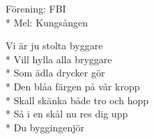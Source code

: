 \begin{SongText}[Byggshymnen]
    \begin{SongInfo}
        Förening: FBI\\*%
        Mel: Kungsången
    \end{SongInfo}
    \begin{SongVerse}
        Vi är ju stolta byggare\\*%
        Vill hylla alla bryggare\\*%
        Som ädla drycker gör\\*%
        Den blåa färgen på vår kropp\\*%
        Skall skänka både tro och hopp\\*%
        Så i en skål nu res dig upp\\*%
        Du byggingenjör
    \end{SongVerse}
\end{SongText}
